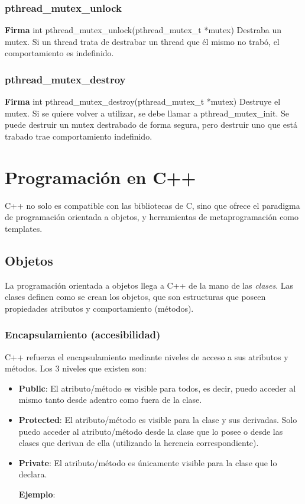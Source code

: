 \documentclass[a4paper, twoside]{article}
\newcommand{\codedir}{../resources/code} %
\begin{document}
\subsubsection{pthread\_mutex\_unlock}
\textbf{Firma} int pthread\_mutex\_unlock(pthread\_mutex\_t *mutex)
Destraba un mutex. Si un thread trata de destrabar un thread que él mismo no trabó, el comportamiento es indefinido.

\subsubsection{pthread\_mutex\_destroy}
\textbf{Firma} int pthread\_mutex\_destroy(pthread\_mutex\_t *mutex)
Destruye el mutex. Si se quiere volver a utilizar, se debe llamar a pthread\_mutex\_init. Se puede destruir un mutex destrabado de forma segura, pero destruir uno que está trabado trae comportamiento indefinido.

\newpage
\section{Programación en C++}
C++ no solo es compatible con las bibliotecas de C, sino que ofrece el paradigma de programación orientada a objetos, y herramientas de metaprogramación como templates.

\subsection{Objetos}
La programación orientada a objetos llega a C++ de la mano de las \emph{clases}. Las clases definen como se crean los objetos, que son estructuras que poseen propiedades atributos y comportamiento (métodos).

\subsubsection{Encapsulamiento (accesibilidad)}
C++ refuerza el encapsulamiento mediante niveles de acceso a sus atributos y métodos. Los 3 niveles que existen son:
\begin{itemize}
	\item \textbf{Public}: El atributo/método es visible para todos, es decir, puedo acceder al mismo tanto desde adentro como fuera de la clase.
	\item \textbf{Protected}: El atributo/método es visible para la clase y sus derivadas. Solo puedo acceder al atributo/método desde la clase que lo posee o desde las clases que derivan de ella (utilizando la herencia correspondiente).
	\item \textbf{Private}: El atributo/método es únicamente visible para la clase que lo declara.

\textbf{Ejemplo}:


\end{itemize}
\end{document}
